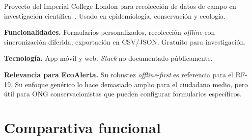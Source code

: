 Proyecto del Imperial College London para recolección de datos de campo en investigación científica~\parencite{epicollect5}. Usado en epidemiología, conservación y ecología.

\textbf{Funcionalidades.}  Formularios personalizados, recolección \textit{offline} con sincronización diferida, exportación en CSV/JSON. Gratuito para investigación.

\textbf{Tecnología.}  App móvil y web. \textit{Stack} no documentado públicamente.

\textbf{Relevancia para EcoAlerta.}  Su robustez \textit{offline}-\textit{first} es referencia para el RF-19. Su enfoque genérico lo hace demasiado amplio para el ciudadano medio, pero útil para ONG conservacionistas que pueden configurar formularios específicos.


\section{Comparativa funcional}
\label{sec:comparativa-funcional}

